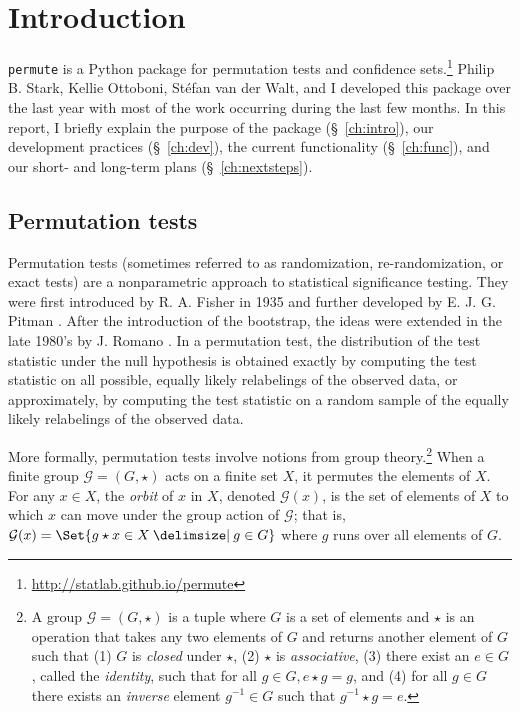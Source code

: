 \chapter{\label{ch:intro}Introduction}

\texttt{permute} is a Python package for permutation tests and confidence
sets.\footnote{\url{http://statlab.github.io/permute}} Philip B. Stark, Kellie
Ottoboni, St\'{e}fan van der Walt, and I developed this package over the last
year with most of the work occurring during the last few months.  In this
report, I briefly explain the purpose of the package (\S~\ref{ch:intro}), our
development practices (\S~\ref{ch:dev}), the current functionality
(\S~\ref{ch:func}), and our short- and long-term plans (\S~\ref{ch:nextsteps}).

\section{Permutation tests}

Permutation tests (sometimes referred to as randomization, re-randomization, or
exact tests) are a nonparametric approach to statistical significance testing.
They were first introduced by R. A. Fisher in 1935 \cite{fisher1935design} and
further developed by E. J. G. Pitman  \cite{pitman1937, pitman1938significance}.
After the introduction of the bootstrap, the ideas were extended in the late
1980's by J. Romano \cite{romano1988bootstrap, romano1989bootstrap}.
In a permutation test, the distribution of the test statistic under the null
hypothesis is obtained exactly by computing the test statistic on all possible,
equally likely relabelings of the observed data, or approximately, by computing
the test statistic on a random sample of the equally likely relabelings of the
observed data.

More formally, permutation tests involve notions from group theory.\footnote{A group $\mathcal{G} = (G, \star)$ is a tuple
where $G$ is a set of elements and $\star$ is an operation that takes any two elements
of $G$ and returns another element of $G$ such that (1) $G$ is \emph{closed} under $\star$,
(2) $\star$ is \emph{associative}, (3) there exist an $e \in G$, called the \emph{identity}, such that
for all $g \in G, e\star g = g$, and (4) for all $g \in G$ there exists an \emph{inverse}
element $g^{-1} \in G$ such that $g^{-1}\star g = e$.}
When a finite group $\mathcal{G} = (G, \star)$
acts on a finite set $X$, it permutes
the elements of $X$.  For any $x \in X$, the \emph{orbit} of $x$ in $X$, denoted
$\mathcal{G}(x)$, is the set of elements of $X$ to which $x$ can move under the group
action of $\mathcal{G}$; that is,
$\mathcal{G}(x) = \Set{g\star x \in X \given g \in G}$
where $g$ runs over all elements of $G$.   

